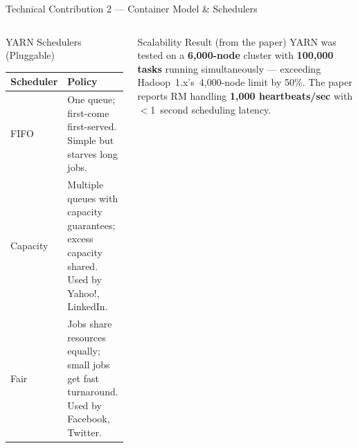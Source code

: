 \documentclass[aspectratio=169,10pt]{beamer}
\begin{document}
\begin{frame}{Technical Contribution 2 — Container Model \& Schedulers}
\begin{columns}[T]
      \begin{block}{YARN Schedulers (Pluggable)}
        \renewcommand{\arraystretch}{1.25}
        \begin{tabular}{@{}lp{4.5cm}@{}}
          \toprule
          \textbf{Scheduler} & \textbf{Policy} \\
          \midrule
          FIFO        & One queue; first-come first-served.
                        Simple but starves long jobs. \\
          Capacity    & Multiple queues with capacity
                        guarantees; excess capacity shared.
                        Used by Yahoo!, LinkedIn. \\
          Fair        & Jobs share resources equally;
                        small jobs get fast turnaround.
                        Used by Facebook, Twitter. \\
          \bottomrule
        \end{tabular}
      \end{block}
      \vspace{5pt}
      \begin{alertblock}{Scalability Result (from the paper)}
        YARN was tested on a \textbf{6{,}000-node} cluster with
        \textbf{100{,}000 tasks} running simultaneously —
        exceeding Hadoop~1.x's~4{,}000-node limit by 50\%.
        The paper reports RM handling \textbf{1{,}000 heartbeats/sec}
        with $<$1~second scheduling latency.
      \end{alertblock}
  \end{columns}
\end{frame}
\end{document}
